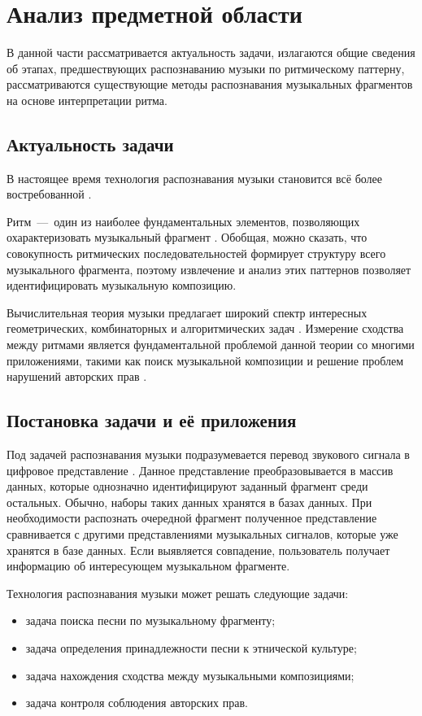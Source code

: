 \chapter{Анализ предметной области}

В данной части рассматривается актуальность задачи, излагаются общие сведения об этапах, предшествующих распознаванию музыки по ритмическому паттерну, рассматриваются существующие методы распознавания музыкальных фрагментов на основе интерпретации ритма.

\section{Актуальность задачи}

В настоящее время технология распознавания музыки становится всё более востребованной \cite{bib14}. 

Ритм~---~один из наиболее фундаментальных элементов, позволяющих охарактеризовать музыкальный фрагмент \cite{bib2}. Обобщая, можно сказать, что совокупность ритмических последовательностей формирует структуру всего музыкального фрагмента, поэтому извлечение и анализ этих паттернов позволяет идентифицировать музыкальную композицию.

Вычислительная теория музыки предлагает широкий спектр интересных геометрических, комбинаторных и алгоритмических задач \cite{bib3}. Измерение сходства между ритмами является фундаментальной проблемой данной теории со многими приложениями, такими как поиск музыкальной композиции и решение проблем нарушений авторских прав \cite{bib2}.

\section{Постановка задачи и её приложения}

Под задачей распознавания музыки подразумевается перевод звукового сигнала в цифровое представление \cite{bib1}. Данное представление преобразовывается в массив данных, которые однозначно идентифицируют заданный фрагмент среди остальных. Обычно, наборы таких данных хранятся в базах данных. При необходимости распознать очередной фрагмент полученное представление сравнивается с другими представлениями музыкальных сигналов, которые уже хранятся в базе данных. Если выявляется совпадение, пользователь получает информацию об интересующем музыкальном фрагменте.

Технология распознавания музыки может решать следующие задачи:
\begin{itemize}
	\item задача поиска песни по музыкальному фрагменту;
	\item задача определения принадлежности песни к этнической культуре;
	\item задача нахождения сходства между музыкальными композициями;
	\item задача контроля соблюдения авторских прав.
\end{itemize}

